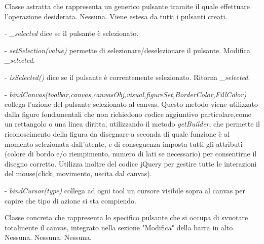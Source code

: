 Classe astratta che rappresenta un generico pulsante tramite il quale effettuare l'operazione desiderata.
Nessuna.
Viene estesa da tutti i pulsanti creati.
\begin{elencopuntato}[\subsubsecindent]
\item[-] \textit{{\_}selected} dice se il pulsante \`e selezionato.
\end{elencopuntato}
\begin{elencopuntato}[\subsubsecindent]
\item[-]  \textit{setSelection(value)} permette di selezionare/deselezionare il pulsante. Modifica \textit{{\_}selected}.
\item[-]  \textit{isSelected()} dice se il pulsante \`e correntemente selezionato. Ritorna \textit{{\_}selected}.
\item[-]  \textit{bindCanvas(toolbar,canvas,canvasObj,visual,figureSet,BorderColor,FillColor)} collega l'azione del pulsante selezionato al canvas. Questo metodo viene utilizzato dalla figure fondamentali che non richiedono codice aggiuntivo particolare,come un rettangolo o una linea diritta, utilizzando il metodo \textit{getBuilder}, che permette il riconoscimento della figura da disegnare a seconda di quale funzione \` e al momento selezionata dall'utente, e di conseguenza imposta tutti gli attributi (colore di bordo e/o riempimento, numero di lati se necessario) per consentirne il disegno corretto. Utilizza inoltre del codice jQuery per gestire tutte le interazioni del mouse(click, movimento, uscita dal canvas). 
\item[-]  \textit{bindCursor(type)} collega ad ogni tool un cursore visibile sopra al canvas per capire che tipo di azione si sta compiendo.
\end{elencopuntato}

Classe concreta che rappresenta lo specifico pulsante che si occupa di svuotare totalmente il canvas, integrato nella sezione "Modifica" della barra in alto.
Nessuna.
Nessuna.
\leftskip=36pt Nessuna.


